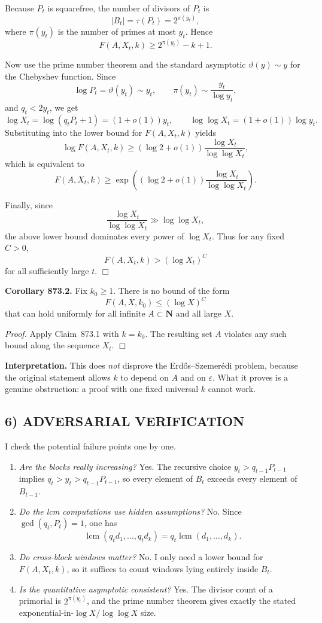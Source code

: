 Because \(P_t\) is squarefree, the number of divisors of \(P_t\) is
\[
|B_t|=\tau(P_t)=2^{\pi(y_t)},
\]
where \(\pi(y_t)\) is the number of primes at most \(y_t\). Hence
\[
F(A,X_t,k)\ge 2^{\pi(y_t)}-k+1.
\]

Now use the prime number theorem and the standard asymptotic \(\vartheta(y)\sim y\) for the Chebyshev function. Since
\[
\log P_t=\vartheta(y_t)\sim y_t,
\qquad
\pi(y_t)\sim \frac{y_t}{\log y_t},
\]
and \(q_t<2y_t\), we get
\[
\log X_t=\log(q_tP_t+1)=(1+o(1))y_t,
\qquad
\log\log X_t=(1+o(1))\log y_t.
\]
Substituting into the lower bound for \(F(A,X_t,k)\) yields
\[
\log F(A,X_t,k)\ge (\log 2+o(1))\frac{\log X_t}{\log\log X_t},
\]
which is equivalent to
\[
F(A,X_t,k)\ge \exp\!\left((\log 2+o(1))\frac{\log X_t}{\log\log X_t}\right).
\]

Finally, since
\[
\frac{\log X_t}{\log\log X_t}\gg \log\log X_t,
\]
the above lower bound dominates every power of \(\log X_t\). Thus for any fixed \(C>0\),
\[
F(A,X_t,k)>(\log X_t)^C
\]
for all sufficiently large \(t\).
\hfill\(\Box\)

\medskip
\noindent\textbf{Corollary 873.2.}
Fix \(k_0\ge 1\). There is no bound of the form
\[
F(A,X,k_0)\le (\log X)^C
\]
that can hold uniformly for all infinite \(A\subset \mathbf{N}\) and all large \(X\).

\medskip
\noindent\emph{Proof.}
Apply Claim~873.1 with \(k=k_0\). The resulting set \(A\) violates any such bound along the sequence \(X_t\).
\hfill\(\Box\)

\medskip
\noindent\textbf{Interpretation.}
This does \emph{not} disprove the Erd\H{o}s--Szemer\'edi problem, because the original statement allows \(k\) to depend on \(A\) and on \(\varepsilon\). What it proves is a genuine obstruction: a proof with one fixed universal \(k\) cannot work.

\subsection*{6) ADVERSARIAL VERIFICATION}

I check the potential failure points one by one.

\begin{enumerate}
\item \emph{Are the blocks really increasing?} Yes. The recursive choice \(y_t>q_{t-1}P_{t-1}\) implies \(q_t>y_t>q_{t-1}P_{t-1}\), so every element of \(B_t\) exceeds every element of \(B_{t-1}\).
\item \emph{Do the lcm computations use hidden assumptions?} No. Since \(\gcd(q_t,P_t)=1\), one has
\[
\operatorname{lcm}(q_t d_1,\dots,q_t d_k)=q_t\operatorname{lcm}(d_1,\dots,d_k).
\]
\item \emph{Do cross-block windows matter?} No. I only need a lower bound for \(F(A,X_t,k)\), so it suffices to count windows lying entirely inside \(B_t\).
\item \emph{Is the quantitative asymptotic consistent?} Yes. The divisor count of a primorial is \(2^{\pi(y_t)}\), and the prime number theorem gives exactly the stated exponential-in-\(\log X/\log\log X\) size.
\end{enumerate}

